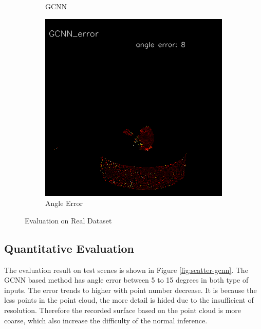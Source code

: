 \begin{figure}[h!]
\begin{subfigure}[b]{0.24\linewidth}
		\caption{GCNN}
	\end{subfigure}
	\begin{subfigure}[b]{0.24\linewidth}
		\includegraphics[width=\linewidth]{./Figures/gcnn-real/fancy_eval_1_error_GCNN.png}
		\caption{Angle Error}
	\end{subfigure}
	\caption{Evaluation on Real Dataset}
	\label{fig:gcnn-eval-real}
\end{figure}



\subsection{Quantitative Evaluation }





The evaluation result on test scenes is shown in Figure \ref{fig:scatter-gcnn}.
The GCNN based method has angle error between 5 to 15 degrees in both type of inputs. The error trends to higher with point number decrease. It is because the less points in the point cloud, the more detail is hided due to the insufficient of resolution. Therefore the recorded surface based on the point cloud is more coarse, which also increase the difficulty of the normal inference.

